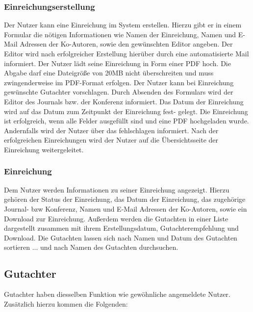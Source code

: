 \subsubsection{Einreichungserstellung}
\begin{description}
    \XXitem{} Der Nutzer kann eine Einreichung im System erstellen. Hierzu gibt er in einem
    Formular die nötigen Informationen wie Namen der Einreichung, Namen und E-Mail Adressen der Ko-Autoren,
    sowie den gewünschten Editor angeben. Der Editor wird nach erfolgreicher Erstellung hierüber durch eine
    automatisierte Mail informiert.
    \XXitem{} Der Nutzer lädt seine Einreichung in Form einer PDF hoch. Die Abgabe darf eine Dateigröße
    von 20MB nicht überschreiten und muss zwingenderweise im PDF-Format erfolgen.
     Der Nutzer kann bei Einreichung gewünschte Gutachter vorschlagen.
    \XXitem{} Durch Absenden des Formulars wird der Editor des Journals bzw. der Konferenz
    informiert. Das Datum der Einreichung wird auf das Datum zum Zeitpunkt der Einreichung fest-
    gelegt.
    \XXitem{} Die Einreichung ist erfolgreich, wenn alle Felder ausgefüllt sind und eine PDF
    hochgeladen wurde. Andernfalls wird der Nutzer über das fehlschlagen informiert.
    \XXitem{} Nach der erfolgreichen Einreichungen wird der Nutzer auf die Übersichtsseite der
    Einreichung weitergeleitet.
\end{description}

\subsubsection{Einreichung}
\begin{description}
     Dem Nutzer werden Informationen zu seiner Einreichung angezeigt.
    Hierzu gehören der Status der Einreichung, das Datum der Einreichung, das zugehörige
    Journal- bzw Konferenz, Namen und E-Mail Adressen der Ko-Autoren, sowie ein Download zur Einreichung.
    \XXitem{} Außerdem werden die Gutachten in einer
    Liste dargestellt zusammen mit ihrem Erstellungsdatum, Gutachterempfehlung und Download. %
    \XXitem{} Die Gutachten lassen sich nach Namen und Datum
    des Gutachten sortieren
    ... und nach Namen des Gutachten durchsuchen.
\end{description}

\subsection{Gutachter}
Gutachter haben diesselben Funktion wie gewöhnliche angemeldete Nutzer. Zusätzlich hierzu kommen
die Folgenden:

